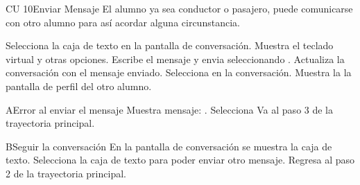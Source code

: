 \begin{UseCase} {CU 10}{Enviar Mensaje}{
	El alumno ya sea conductor o pasajero, puede comunicarse con otro alumno para así acordar alguna circunstancia.
}




\end{UseCase}


\begin{UCtrayectoria}
	
	\UCpaso [\UCactor]	Selecciona la caja de texto en la pantalla de conversación. 
	\UCpaso [\UCsist]Muestra el teclado virtual y otras opciones.
	\UCpaso [\UCactor]Escribe el mensaje y envia seleccionando .
	\UCpaso [\UCsist]Actualiza la conversación con el mensaje enviado.
	\UCpaso [\UCactor]	Selecciona  en la conversación. 
	\UCpaso [\UCsist]Muestra la la pantalla de perfil del otro alumno.
\end{UCtrayectoria}



\begin{UCtrayectoriaA}{A}{Error al enviar el mensaje}
	\UCpaso [\UCsist]Muestra mensaje: .
	\UCpaso [\UCactor]	Selecciona 
	\UCpaso Va al paso 3 de la trayectoria principal.
\end{UCtrayectoriaA}

\begin{UCtrayectoriaA}{B}{Seguir la conversación}
	\UCpaso [\UCsist]En la pantalla de conversación se muestra la caja de texto.
	\UCpaso [\UCactor]	Selecciona la caja de texto para poder enviar otro mensaje.
	\UCpaso Regresa al paso 2 de la trayectoria principal.
\end{UCtrayectoriaA}

